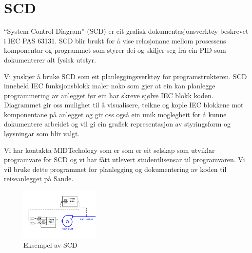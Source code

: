 \section{SCD}
\thispagestyle{fancy}


``System Control Diagram'' (\gls{SCD})  er eit grafisk dokumentasjonsverktøy beskrevet i \gls{IEC} \gls{PAS} 63131.\newline
 \gls{SCD} blir brukt for å vise relasjonane mellom prosessens komponentar og programmet som styrer dei og skiljer seg frå ein \gls{PID}
 som dokumenterer alt fysisk utstyr.

 Vi ynskjer å bruke \gls{SCD} som eit planleggingsverktøy for programstrukteren. \gls{SCD} inneheld \gls{IEC} funksjonsblokk maler noko som gjer at ein kan
 planlegge programmering av anlegget før ein har skreve sjølve \gls{IEC} blokk koden.
 Diagrammet gir oss mulighet til å visualisere, teikne og kople \gls{IEC} blokkene mot komponentane på anlegget og 
 gir oss også ein unik moglegheit for å kunne dokumentere arbeidet og vil gi ein grafisk representasjon
 av styringsform og løysningar som blir valgt.

 Vi har kontakta MIDTechology \citep{MIDT} som er som er eit selskap som utviklar programvare for \gls{SCD} og vi har fått utlevert studentlisensar
 til programvaren. Vi vil bruke dette programmet for planlegging og dokumentering av koden til reiseanlegget på Sande.

 \begin{figure}[htbp]
    \centering
    \includegraphics[width=0.35\textwidth]{Bilder/Visio_eksempel.png}
    \caption{Eksempel av \gls{SCD}}\label{fig:SCD eksempel}    
\end{figure}

\newpage